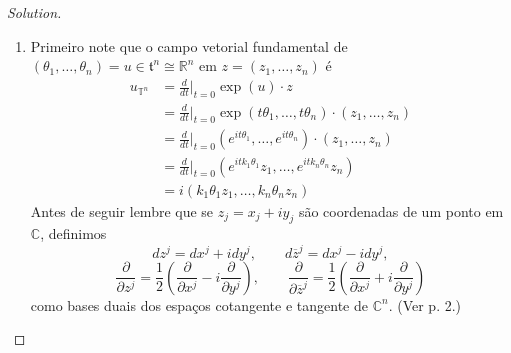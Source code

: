 \begin{proof}[Solution]\leavevmode
\begin{enumerate}[label=(\alph*)]
\item Primeiro note que o campo vetorial fundamental de $(\theta_1,\ldots,\theta_n)=u\in\mathfrak{t}^n\cong \mathbb{R}^n$ em $z=(z_1,\ldots,z_n)$ é
	\begin{align*}
	u_{\mathbb{T}^n}&=\frac{d}{dt}\Big|_{t=0}\operatorname{exp}(u)\cdot z\\&=\frac{d}{dt}\Big|_{t=0}\operatorname{exp}(t\theta_1,\ldots,t\theta_n)\cdot (z_1,\ldots,z_n)\\&=\frac{d}{dt}\Big|_{t=0}\left( e^{it\theta_1},\ldots,e^{it\theta_n} \right) \cdot(z_1,\ldots,z_n)\\
	&=\frac{d}{dt}\Big|_{t=0}\left( e^{itk_1\theta_1}z_1,\ldots,e^{itk_n\theta_n}z_n \right)\\
	&=i\left( k_1\theta_1z_1,\ldots,k_n\theta_nz_n \right) 
	\end{align*}
	Antes de seguir lembre que se $z_j=x_j+iy_j$ são coordenadas de um ponto em $\mathbb{C}$, definimos
	\[dz^j=dx^j+idy^j,\qquad d\overline{z}^j=dx^j-idy^j,\]
	\[\frac{\partial }{\partial z^j}=\frac{1}{2}\left( \frac{\partial }{\partial x^j}-i\frac{\partial }{\partial y^j} \right) ,\qquad \frac{\partial }{\partial \overline{z}^j}=\frac{1}{2}\left( \frac{\partial }{\partial x^j}+i \frac{\partial }{\partial y^j} \right) \]
como bases duais dos espaços cotangente e tangente de $\mathbb{C}^n$. (Ver \cite{gri} p. 2.)


\end{enumerate}
\end{proof}
